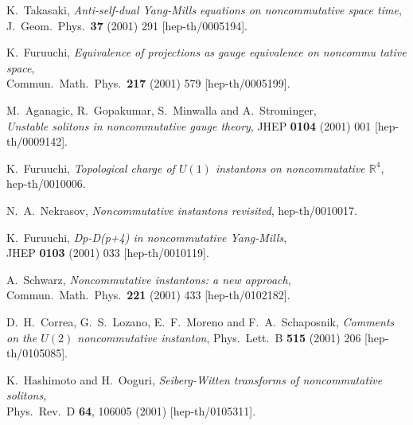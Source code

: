 \documentclass[a4paper,11pt,english]{article}
\numberwithin{equation}{section}
\renewcommand{\=}{\ =\ }
\begin{document}
\begin{thebibliography}{99}
         K.~Takasaki,
         {\em Anti-self-dual Yang-Mills equations on noncommutative space%
time},\\
         J.\ Geom.\ Phys.\  {\bf 37} (2001) 291
         [hep-th/0005194].

         K.~Furuuchi,
         {\em Equivalence of projections as gauge equivalence on noncommu%
tative space},\\
         Commun.\ Math.\ Phys.\  {\bf 217} (2001) 579
         [hep-th/0005199].

         M.~Aganagic, R.~Gopakumar, S.~Minwalla and A.~Strominger,\\
         {\em Unstable solitons in noncommutative gauge theory},
         JHEP {\bf 0104} (2001) 001
         [hep-th/0009142].

         K.~Furuuchi,
         {\em Topological charge of $U(1)$ instantons on noncommutative $%
\mathbb{R}^4$},
         hep-th/0010006.

         N.~A.~Nekrasov,
         {\em Noncommutative instantons revisited},
         hep-th/0010017.

         K.~Furuuchi,
         {\em Dp-D(p+4) in noncommutative Yang-Mills},\\
         JHEP {\bf 0103} (2001) 033
         [hep-th/0010119].

         A.~Schwarz,
         {\em Noncommutative instantons: a new approach},\\
         Commun.\ Math.\ Phys.\  {\bf 221} (2001) 433
         [hep-th/0102182].

         D.~H.~Correa, G.~S.~Lozano, E.~F.~Moreno and F.~A.~Schaposnik,
         {\em Comments on the $U(2)$ noncommutative instanton},
         Phys.\ Lett.\ B {\bf 515} (2001) 206
         [hep-th/0105085].

         K.~Hashimoto and H.~Ooguri,
         {\em Seiberg-Witten transforms of noncommutative solitons},\\
         Phys.\ Rev.\ D {\bf 64}, 106005 (2001)
         [hep-th/0105311].


\end{thebibliography}
\end{document}

